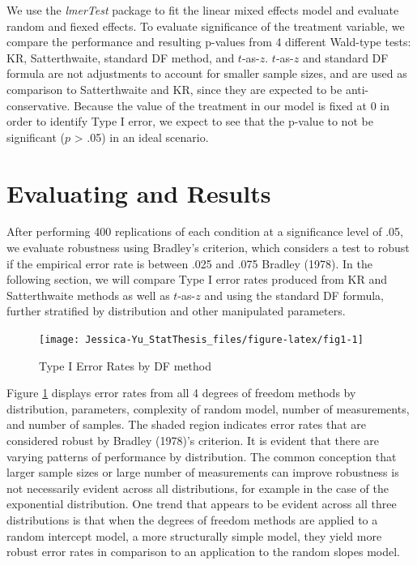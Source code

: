 \documentclass[12pt, twoside]{amherstthesis}
\begin{document}
We use the \emph{lmerTest} package to fit the linear mixed effects model and evaluate random and fiexed effects. To evaluate significance of the treatment variable, we compare the performance and resulting p-values from 4 different Wald-type tests: KR, Satterthwaite, standard DF method, and \(t\)-as-\(z\). \(t\)-as-\(z\) and standard DF formula are not adjustments to account for smaller sample sizes, and are used as comparison to Satterthwaite and KR, since they are expected to be anti-conservative. Because the value of the treatment in our model is fixed at 0 in order to identify Type I error, we expect to see that the p-value to not be significant (\(p\) \textgreater{} .05) in an ideal scenario.

\hypertarget{evaluating-and-results}{%
\section{Evaluating and Results}\label{evaluating-and-results}}

After performing 400 replications of each condition at a significance level of .05, we evaluate robustness using Bradley's criterion, which considers a test to robust if the empirical error rate is between .025 and .075 Bradley (1978). In the following section, we will compare Type I error rates produced from KR and Satterthwaite methods as well as \(t\)-as-\(z\) and using the standard DF formula, further stratified by distribution and other manipulated parameters.
\begin{figure}

{\centering \texttt{[image: Jessica-Yu\_StatThesis\_files/figure-latex/fig1-1]} 

}

\caption{Type I Error Rates by DF method}\label{fig:fig1}
\end{figure}
Figure \ref{fig:fig1} displays error rates from all 4 degrees of freedom methods by distribution, parameters, complexity of random model, number of measurements, and number of samples. The shaded region indicates error rates that are considered robust by Bradley (1978)'s criterion. It is evident that there are varying patterns of performance by distribution. The common conception that larger sample sizes or large number of measurements can improve robustness is not necessarily evident across all distributions, for example in the case of the exponential distribution. One trend that appears to be evident across all three distributions is that when the degrees of freedom methods are applied to a random intercept model, a more structurally simple model, they yield more robust error rates in comparison to an application to the random slopes model.
\end{document}
